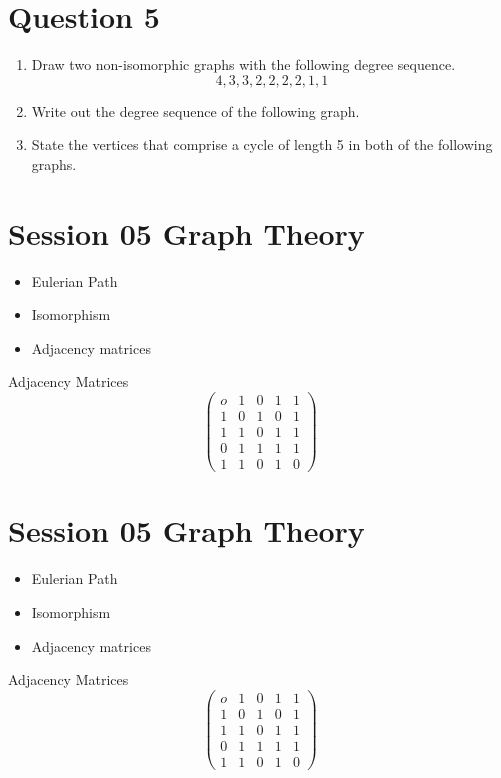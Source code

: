 \documentclass[]{report}
\begin{document}
\section*{Question 5}
\begin{enumerate}
\item Draw two non-isomorphic graphs with the following degree sequence.
\[ 4,3,3,2,2,2,2,1,1\]
\item Write out the degree sequence of the following graph.
\item State the vertices that comprise a cycle of length 5 in both of the following graphs.
%
\end{enumerate}




\section*{Session 05 Graph Theory}
\begin{itemize}
\item Eulerian Path
\item Isomorphism
\item Adjacency matrices
\end{itemize}
Adjacency Matrices
\[ \left( \begin{matrix}
o & 1 & 0 & 1 & 1 \\ 
1 & 0 & 1 & 0 & 1 \\ 
1 & 1 & 0 & 1 & 1 \\ 
0 & 1 & 1 & 1 & 1 \\ 
1 & 1 & 0 & 1 & 0
\end{matrix} \right) \]


\section*{Session 05 Graph Theory}
\begin{itemize}
\item Eulerian Path
\item Isomorphism
\item Adjacency matrices
\end{itemize}
Adjacency Matrices
\[ \left( \begin{matrix}
o & 1 & 0 & 1 & 1 \\ 
1 & 0 & 1 & 0 & 1 \\ 
1 & 1 & 0 & 1 & 1 \\ 
0 & 1 & 1 & 1 & 1 \\ 
1 & 1 & 0 & 1 & 0
\end{matrix} \right) \]
\end{document}
